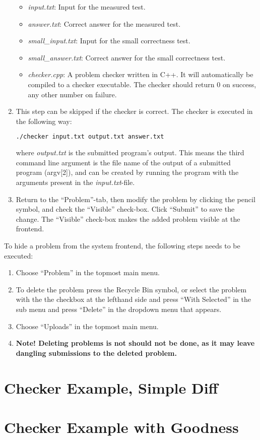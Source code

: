 \begin{enumerate}
\begin{itemize}
    \item \textit{input.txt}: Input for the measured test.
    \item \textit{answer.txt}: Correct answer for the measured test.
    \item \textit{small_input.txt}: Input for the small correctness test.
    \item \textit{small_answer.txt}: Correct answer for the small correctness test.
    \item \textit{checker.cpp}: A problem checker written in C++. It will automatically be compiled to a checker executable. The checker should return 0 on success, any other number on failure.
  \end{itemize}
  \item This step can be skipped if the checker is correct. The checker is executed in the following way:
  \begin{lstlisting}[language=sh]
  ./checker input.txt output.txt answer.txt
  \end{lstlisting}
  where \textit{output.txt} is the submitted program’s output. This means the third command line argument is the file name of the output of a submitted program (argv[2]), and can be created by running the program with the arguments present in the \textit{input.txt}-file.
  \item Return to the ``Problem''-tab, then modify the problem by clicking the pencil symbol, and
  check the ``Visible'' check-box. Click ``Submit'' to save the change. The ``Visible'' check-box makes the added problem visible at the frontend.
\end{enumerate}

To hide a problem from the system frontend, the following steps needs to be executed:
\begin{enumerate}
  \item Choose ``Problem'' in the topmost main menu.
  \item To delete the problem press the Recycle Bin symbol, or select the problem with the the checkbox at the lefthand side and press ``With Selected'' in the sub menu and press ``Delete'' in the dropdown menu that appears.
  \item Choose ``Uploads'' in the topmost main menu.
  \item \textbf{Note! Deleting problems is not should not be done, as it may leave dangling submissions to the deleted problem.}
\end{enumerate}

\section{Checker Example, Simple Diff}

\section{Checker Example with Goodness}
